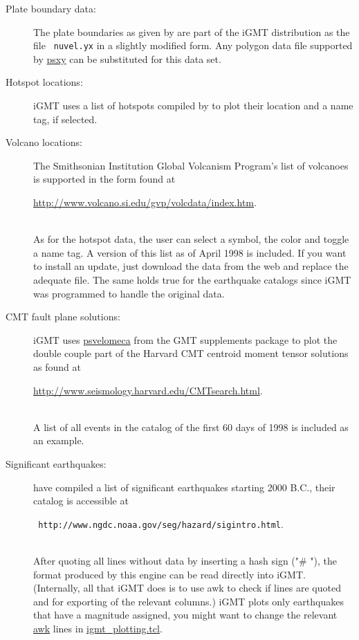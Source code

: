 \documentclass[11pt]{article}
\begin{document}
\begin{description}
  
\item[Plate boundary data:] The plate boundaries as given by
  \cite{demets90} are part of the iGMT distribution as the file {\tt
    nuvel.yx} in a slightly modified form. Any polygon data file
  supported by \url{psxy} can be substituted for this data set.

  
\item[Hotspot locations:] iGMT uses a list of hotspots compiled by
  \cite{steinberger00b} to plot their location and a name tag, if
  selected.
  
\item[Volcano locations:] The Smithsonian Institution Global Volcanism
  Program's list of volcanoes \citep{simkin94} is supported
  in the form found at\\
  \centerline{\url{http://www.volcano.si.edu/gvp/volcdata/index.htm}.}\\
  As for the hotspot data, the user can select a symbol, the color and
  toggle a name tag. A version of this list as of April 1998 is
  included. If you want to install an update, just download the data
  from the web and replace the adequate file. The same holds true for
  the earthquake catalogs since iGMT was programmed to handle the
  original data.

  
\item[CMT fault plane solutions:] iGMT uses \url{psvelomeca} from the
  GMT supplements package to plot the double couple part of the
  Harvard CMT centroid moment tensor solutions \cite[e.g.][]{cmtreview} as found at\\
  \centerline{\url{http://www.seismology.harvard.edu/CMTsearch.html}.}\\
  A list of all events in the catalog of the first 60 days of 1998 is
  included as an example.

  
\item[Significant earthquakes:] \cite{ngdc_sig} have compiled a list
  of significant earthquakes starting 2000 B.C., their catalog is accessible at\\
  \centerline{{\tt
      http://www.ngdc.noaa.gov/seg/hazard/sigintro.html}.}\\ After
  quoting all lines without data by inserting a hash sign ("\# "), the
  format produced by this engine can be read directly into iGMT.
  (Internally, all that iGMT does is to use awk to check if lines are
  quoted and for exporting of the relevant columns.) iGMT plots only
  earthquakes that have a magnitude assigned, you might want to change
  the relevant \url{awk} lines in \url{igmt_plotting.tcl}.
  

\end{description}
\end{document}

